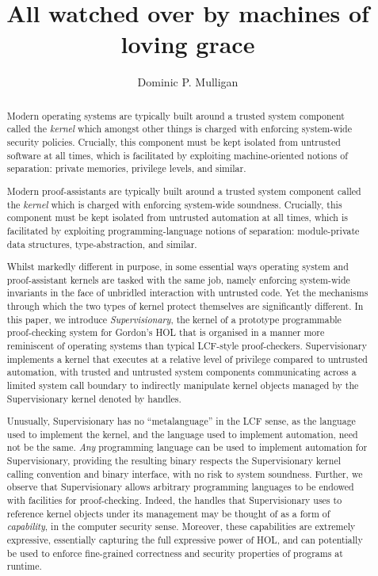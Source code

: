\documentclass[a4paper, UKenglish, cleveref, autoref, thm-restate, colorlinks]{lipics-v2021}
\title{All watched over by machines of loving grace}
\author{Dominic P. Mulligan}{Automated Reasoning Group, Amazon Web Services, Cambridge, United Kingdom\footnote{All work done whilst employed within the Systems Research Group, Arm Research, Cambridge} \and \url{www.dominic-mulligan.co.uk}}{dominic.p.mulligan@gmail.com}{}{}
\begin{document}
\maketitle

\begin{abstract}
Modern operating systems are typically built around a trusted system component called the \emph{kernel} which amongst other things is charged with enforcing system-wide security policies.
Crucially, this component must be kept isolated from untrusted software at all times, which is facilitated by exploiting machine-oriented notions of separation: private memories, privilege levels, and similar.

Modern proof-assistants are typically built around a trusted system component called the \emph{kernel} which is charged with enforcing system-wide soundness.
Crucially, this component must be kept isolated from untrusted automation at all times, which is facilitated by exploiting programming-language notions of separation: module-private data structures, type-abstraction, and similar.

Whilst markedly different in purpose, in some essential ways operating system and proof-assistant kernels are tasked with the same job, namely enforcing system-wide invariants in the face of unbridled interaction with untrusted code.  Yet the mechanisms through which the two types of kernel protect themselves are significantly different.
In this paper, we introduce \emph{Supervisionary}, the kernel of a prototype programmable proof-checking system for Gordon's HOL that is organised in a manner more reminiscent of operating systems than typical LCF-style proof-checkers.
Supervisionary implements a kernel that executes at a relative level of privilege compared to untrusted automation, with trusted and untrusted system components communicating across a limited system call boundary to indirectly manipulate kernel objects managed by the Supervisionary kernel denoted by handles.

Unusually, Supervisionary has no ``metalanguage'' in the LCF sense, as the language used to implement the kernel, and the language used to implement automation, need not be the same.
\emph{Any} programming language can be used to implement automation for Supervisionary, providing the resulting binary respects the Supervisionary kernel calling convention and binary interface, with no risk to system soundness.
Further, we observe that Supervisionary allows arbitrary programming languages to be endowed with facilities for proof-checking.
Indeed, the handles that Supervisionary uses to reference kernel objects under its management may be thought of as a form of \emph{capability}, in the computer security sense.
Moreover, these capabilities are extremely expressive, essentially capturing the full expressive power of HOL, and can potentially be used to enforce fine-grained correctness and security properties of programs at runtime.
\end{abstract}
\end{document}

